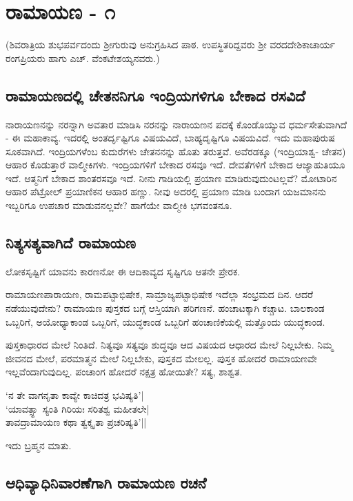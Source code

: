 \chapter{ರಾಮಾಯಣ - ೧}

(ಶಿವರಾತ್ರಿಯ ಶುಭಪರ್ವದಂದು ಶ್ರೀಗುರುವು ಅನುಗ್ರಹಿಸಿದ ಪಾಠ. ಉಪಸ್ಥಿತರಿದ್ದವರು ಶ್ರೀ ವರದದೇಶಿಕಾಚಾರ್ಯ ರಂಗಪ್ರಿಯರು ಹಾಗು ಎಚ್. ವೆಂಕಟೇಶಯ್ಯನವರು.)

\section*{ರಾಮಾಯಣದಲ್ಲಿ  ಚೇತನನಿಗೂ ಇಂದ್ರಿಯಗಳಿಗೂ ಬೇಕಾದ ರಸವಿದೆ}

ನಾರಾಯಣನನ್ನು ನರನ್ನಾಗಿ ಅವತಾರ ಮಾಡಿಸಿ ನರನನ್ನು  ನಾರಾಯಣನ ಪದಕ್ಕೆ ಕೊಂಡೊಯ್ಯುವ ಧರ್ಮಸೇತುವಾಗಿದೆ  - ಈ ಮಹಾಕಾವ್ಯ. ಇದರಲ್ಲಿ ಅಂತರ್ದೃಷ್ಟಿಗೂ ವಿಷಯವಿದೆ, ಬಾಹ್ಯದೃಷ್ಟಿಗೂ ವಿಷಯವಿದೆ. ಇದು ಮಹಾಪುರುಷ ಸೂಕವಾಗಿದೆ. ಇಂದ್ರಿಯಗಳೆಂಬ ಕುದುರೆಗಳು ಚೇತನನನ್ನು ಹೊತು ತರುತ್ತವೆ. ಅವೆರಡಕ್ಕೂ (ಇಂದ್ರಿಯಾಶ್ವ- ಚೇತನ) ಆಹಾರ ಕೊಡುತ್ತಾರೆ ವಾಲ್ಮೀಕಿಗಳು. ಇಂದ್ರಿಯಗಳಿಗೆ ಬೇಕಾದ ರಸವೂ ಇದೆ. ದೇವತೆಗಳಿಗೆ ಬೇಕಾದ ಆಜ್ಯಾಹುತಿಯೂ ಇದೆ. ಆತ್ಮನಿಗೆ ಬೇಕಾದ ಶಾಂತರಸವೂ ಇದೆ. ನೀನು ಗಾಡಿಯಲ್ಲಿ ಪ್ರಯಾಣ ಮಾಡಿರುವುದುಂಟಲ್ಲವೆ? ಮೋಟಾರಿನ ಆಹಾರ ಪೆಟ್ರೋಲ್ ಪ್ರಯಾಣಿಕನ ಆಹಾರ ಹಣ್ಣು. ನೀವು ಅದರಲ್ಲಿ ಪ್ರಯಾಣ ಮಾಡಿ ಬಂದಾಗ  ಯಜಮಾನನು ಇಬ್ಬರಿಗೂ ಉಪಚಾರ ಮಾಡುವನಲ್ಲವೇ? ಹಾಗೆಯೇ ವಾಲ್ಮೀಕಿ ಭಗವಂತನೂ. 

\section*{ನಿತ್ಯಸತ್ಯವಾಗಿದೆ ರಾಮಾಯಣ}

ಲೋಕಸೃಷ್ಟಿಗೆ ಯಾವನು ಕಾರಣನೋ ಈ ಆದಿಕಾವ್ಯದ ಸೃಷ್ಟಿಗೂ ಆತನೇ ಪ್ರೇರಕ.

ರಾಮಾಯಣಪಾರಾಯಣ, ರಾಮಪಟ್ಟಾಭಿಷೇಕ, ಸಾಮ್ರಾಜ್ಯಪಟ್ಟಾಭಿಷೇಕ ಇದೆಲ್ಲಾ ಸಂಭ್ರಮದ ದಿನ. ಆದರೆ ನಡೆಯುವುದೇನು? ರಾಮಾಯಣ ಪುಸ್ತಕದ ಬಗ್ಗೆ ಆಸ್ತಿಯಾಗಿ ಪರಿಗಣನೆ. ಹಂಚಾಟಕ್ಕಾಗಿ ಕಚ್ಚಾಟ. ಬಾಲಕಾಂಡ ಒಬ್ಬರಿಗೆ, ಅಯೋಧ್ಯಾಕಾಂಡ ಒಬ್ಬರಿಗೆ, ಯುದ್ಧಕಾಂಡ ಒಬ್ಬರಿಗೆ ಹಂಚಾಣಿಕೆಯಲ್ಲಿ ಮತ್ತೊಂದು ಯುದ್ಧಕಾಂಡ. 

ಪುಸ್ತಕಾಧಾರದ ಮೇಲೆ ನಿಂತಿದೆ. ನಿತ್ಯವೂ ಸತ್ಯವೂ ಶುದ್ಧವೂ ಆದ ವಿಷಯದ ಆಧಾರದ ಮೇಲೆ ನಿಲ್ಲಬೇಕು. ನಿಮ್ಮ ಜೀವನದ ಮೇಲೆ, ಪರಮಾತ್ಮನ ಮೇಲೆ ನಿಲ್ಲಬೇಕು, ಪುಸ್ತಕದ ಮೇಲಲ್ಲ. ಪುಸ್ತಕ ಹೋದರೆ ರಾಮಾಯಣವೇ ಇಲ್ಲವೆಂದಾಗುವುದಿಲ್ಲ. ಪಂಚಾಂಗ ಹೋದರೆ ನಕ್ಷತ್ರ ಹೋಯಿತೇ? ಸತ್ಯ, ಶಾಶ್ವತ. 

\begin{shloka}
`ನ ತೇ ವಾಗನೃತಾ ಕಾವ್ಯೇ ಕಾಚಿದತ್ರ ಭವಿಷ್ಯತಿ'|\label{209}\\
`ಯಾವತ್ಸ್ಥಾ ಸ್ಯಂತಿ ಗಿರಿಯಃ ಸರಿತಶ್ವ ಮಹೀತಲೇ|\label{210b}\\
ತಾವದ್ರಾಮಾಯಣ ಕಥಾ ತ್ವಕ್ಕೃತಾ ಪ್ರಚರಿಷ್ಯತಿ'||
\end{shloka}

ಇದು ಬ್ರಹ್ಮನ ಮಾತು.

\section*{ಆಧಿವ್ಯಾಧಿನಿವಾರಣೆಗಾಗಿ ರಾಮಾಯಣ ರಚನೆ}

